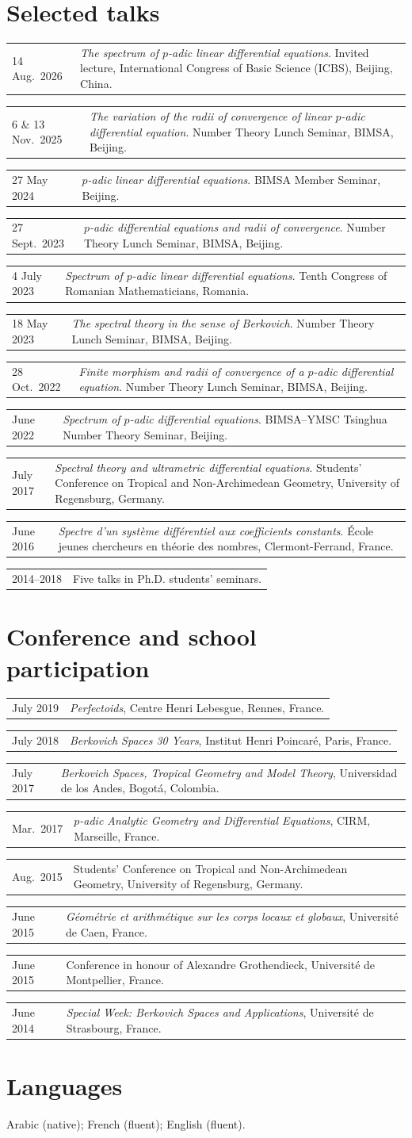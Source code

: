 \documentclass[11pt,a4paper]{article}
\makeatletter
\newcommand{\shortentry}[2]{%
  \begin{tabularx}{\textwidth}{@{}>{\raggedright\arraybackslash}p{32mm}@{\hspace{4mm}}>{\raggedright\arraybackslash}X@{}}\textcolor{muted}{#1} & #2\end{tabularx}\par\vspace{3pt}}
\makeatother
\begin{document}
\newpage
\section{Selected talks}
\shortentry{14 Aug.\ 2026}{\emph{The spectrum of $p$-adic linear differential equations}. Invited lecture, International Congress of Basic Science (ICBS), Beijing, China.}
\shortentry{6 \& 13 Nov.\ 2025}{\emph{The variation of the radii of convergence of linear $p$-adic differential equation}. Number Theory Lunch Seminar, BIMSA, Beijing.}
\shortentry{27 May 2024}{\emph{$p$-adic linear differential equations}. BIMSA Member Seminar, Beijing.}
\shortentry{27 Sept.\ 2023}{\emph{$p$-adic differential equations and radii of convergence}. Number Theory Lunch Seminar, BIMSA, Beijing.}
\shortentry{4 July 2023}{\emph{Spectrum of $p$-adic linear differential equations}. Tenth Congress of Romanian Mathematicians, Romania.}
\shortentry{18 May 2023}{\emph{The spectral theory in the sense of Berkovich}. Number Theory Lunch Seminar, BIMSA, Beijing.}
\shortentry{28 Oct.\ 2022}{\emph{Finite morphism and radii of convergence of a $p$-adic differential equation}. Number Theory Lunch Seminar, BIMSA, Beijing.}
\shortentry{June 2022}{\emph{Spectrum of $p$-adic differential equations}. BIMSA--YMSC Tsinghua Number Theory Seminar, Beijing.}
\shortentry{July 2017}{\emph{Spectral theory and ultrametric differential equations}. Students' Conference on Tropical and Non-Archimedean Geometry, University of Regensburg, Germany.}
\shortentry{June 2016}{\emph{Spectre d'un syst\`eme diff\'erentiel aux coefficients constants}. \'Ecole jeunes chercheurs en th\'eorie des nombres, Clermont-Ferrand, France.}
\shortentry{2014--2018}{Five talks in Ph.D. students' seminars.}

\section{Conference and school participation}
\shortentry{July 2019}{\emph{Perfectoids}, Centre Henri Lebesgue, Rennes, France.}
\shortentry{July 2018}{\emph{Berkovich Spaces 30 Years}, Institut Henri Poincar\'e, Paris, France.}
\shortentry{July 2017}{\emph{Berkovich Spaces, Tropical Geometry and Model Theory}, Universidad de los Andes, Bogot\'a, Colombia.}
\shortentry{Mar.\ 2017}{\emph{$p$-adic Analytic Geometry and Differential Equations}, CIRM, Marseille, France.}
\shortentry{Aug.\ 2015}{Students' Conference on Tropical and Non-Archimedean Geometry, University of Regensburg, Germany.}
\shortentry{June 2015}{\emph{G\'eom\'etrie et arithm\'etique sur les corps locaux et globaux}, Universit\'e de Caen, France.}
\shortentry{June 2015}{Conference in honour of Alexandre Grothendieck, Universit\'e de Montpellier, France.}
\shortentry{June 2014}{\emph{Special Week: Berkovich Spaces and Applications}, Universit\'e de Strasbourg, France.}

\section{Languages}
Arabic (native); French (fluent); English (fluent).
\end{document}
